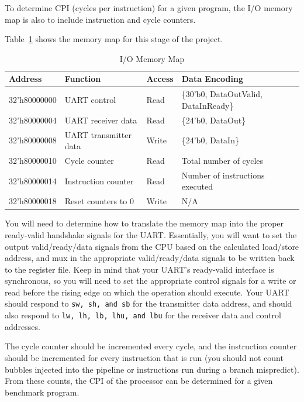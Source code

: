 \documentclass[11pt]{article}
\begin{document}
To determine CPI (cycles per instruction) for a given program, the I/O memory map is also to include instruction and cycle counters.

Table~\ref{mem_map1} shows the memory map for this stage of the project.

\begin{table}[hbt]
	\begin{center}
		\caption{I/O Memory Map}
		\label{mem_map1}
		\begin{tabular}{l l l l}
			\toprule
			\textbf{Address} & \textbf{Function} & \textbf{Access} & \textbf{Data Encoding}\\
			\midrule
			32'h80000000 & UART control & Read & \{30'b0, DataOutValid, DataInReady\} \\
			32'h80000004 & UART receiver data & Read & \{24'b0, DataOut\} \\
			32'h80000008 & UART transmitter data & Write & \{24'b0, DataIn\} \\
			\midrule
			32'h80000010 & Cycle counter & Read & Total number of cycles \\
			32'h80000014 & Instruction counter & Read & Number of instructions executed \\
			32'h80000018 & Reset  counters to 0 & Write & N/A \\
			\bottomrule
		\end{tabular}
	\end{center}
\end{table}

You will need to determine how to translate the memory map into the proper ready-valid handshake signals for the UART. Essentially, you will want to set the output valid/ready/data signals from the CPU based on the calculated load/store address, and mux in the appropriate valid/ready/data signals to be written back to the register file. Keep in mind that your UART's ready-valid interface is synchronous, so you will need to set the appropriate control signals for a write or read before the rising edge on which the operation should execute. Your UART should respond to \verb|sw, sh, and sb| for the transmitter data address, and should also respond to \verb|lw, lh, lb, lhu, and lbu| for the receiver data and control addresses.

The cycle counter should be incremented every cycle, and the instruction counter should be incremented for every instruction that is run (you should not count bubbles injected into the pipeline or instructions run during a branch mispredict). From these counts, the CPI of the processor can be determined for a given benchmark program.
\end{document}
